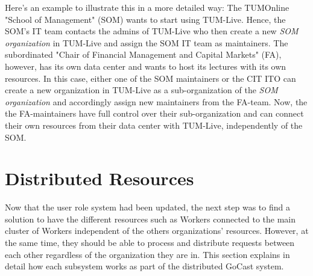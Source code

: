 Here's an example to illustrate this in a more detailed way:
The TUMOnline "School of Management" (SOM) wants to start using TUM-Live. Hence, the SOM's IT team contacts the admins of TUM-Live who then create a new \textit{SOM organization} in TUM-Live and assign the SOM IT team as maintainers.
The subordinated "Chair of Financial Management and Capital Markets" (FA), however, has its own data center and wants to host its lectures with its own resources. In this case, either one of the SOM maintainers or the \ac{CIT} \ac{ITO} can create a new organization in TUM-Live as a sub-organization of the \textit{SOM organization} and accordingly assign new maintainers from the FA-team. Now, the the FA-maintainers have full control over their sub-organization and can connect their own resources from their data center with TUM-Live, independently of the SOM.











\section{Distributed Resources}

Now that the user role system had been updated, the next step was to find a solution to have the different resources such as Workers connected to the main cluster of Workers independent of the others organizations' resources. However, at the same time, they should be able to process and distribute requests between each other regardless of the organization they are in. This section explains in detail how each subsystem works as part of the distributed GoCast system. 

